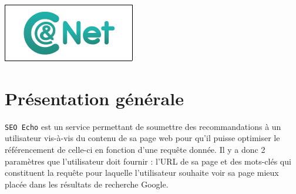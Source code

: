 \documentclass[12pt]{article}
\begin{document}
\begin{titlepage}
\includegraphics[scale=1]{logocometnet.png}\\[1cm] %
 

\vfill %

\end{titlepage}


\renewcommand{\contentsname}{Table des matières}

\tableofcontents{}



\newpage
\section{Présentation générale}

\texttt{SEO Echo} est un service permettant de soumettre des recommandations à un utilisateur vis-à-vis du contenu de sa page web pour qu'il puisse optimiser le référencement de celle-ci en fonction d'une requête donnée. Il y a donc 2 paramètres que l'utilisateur doit fournir : l'URL de sa page et des mots-clés qui constituent la requête pour laquelle l'utilisateur souhaite voir sa page mieux placée dans les résultats de recherche Google.

\
\end{document}
